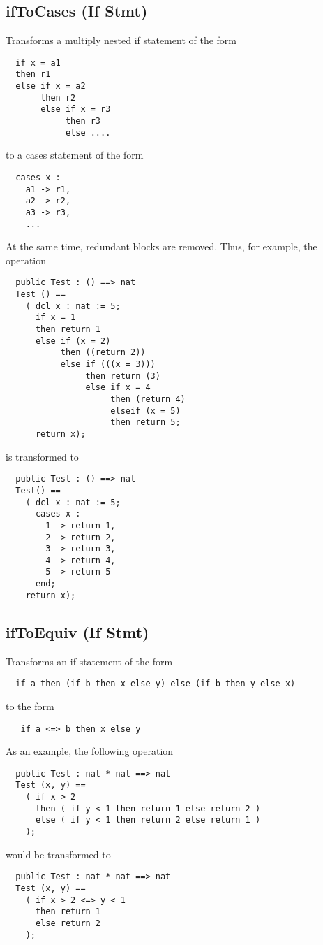 \documentclass[\pformat,12pt]{article}
\begin{document}
\subsection{ifToCases (If Stmt)}
  Transforms a multiply nested if statement of the form
\begin{verbatim}
  if x = a1
  then r1
  else if x = a2
       then r2
       else if x = r3
            then r3
            else ....
\end{verbatim}

to a cases statement of the form
\begin{verbatim}
  cases x :
    a1 -> r1,
    a2 -> r2,
    a3 -> r3,
    ...
\end{verbatim}
At the same time, redundant blocks are removed. Thus, for example, the operation
\begin{verbatim}
  public Test : () ==> nat  
  Test () ==
    ( dcl x : nat := 5;
      if x = 1 
      then return 1
      else if (x = 2) 
           then ((return 2))
           else if (((x = 3))) 
                then return (3) 
                else if x = 4 
                     then (return 4)
                     elseif (x = 5)
                     then return 5; 
      return x);
\end{verbatim}
is transformed to
\begin{verbatim}
  public Test : () ==> nat
  Test() == 
    ( dcl x : nat := 5;
      cases x :
        1 -> return 1,
        2 -> return 2,
        3 -> return 3,
        4 -> return 4,
        5 -> return 5
      end;
    return x);
\end{verbatim}


\subsection{ifToEquiv (If Stmt)}
  Transforms an if statement of the form 
\begin{verbatim}
  if a then (if b then x else y) else (if b then y else x) 
\end{verbatim}    
to the form
\begin{verbatim} 
   if a <=> b then x else y
\end{verbatim}

As an example, the following operation
\begin{verbatim}
  public Test : nat * nat ==> nat  
  Test (x, y) ==
    ( if x > 2 
      then ( if y < 1 then return 1 else return 2 )
      else ( if y < 1 then return 2 else return 1 ) 
    );
\end{verbatim}
would be transformed to
\begin{verbatim}
  public Test : nat * nat ==> nat  
  Test (x, y) ==
    ( if x > 2 <=> y < 1 
      then return 1 
      else return 2 
    );
\end{verbatim}
\end{document}
